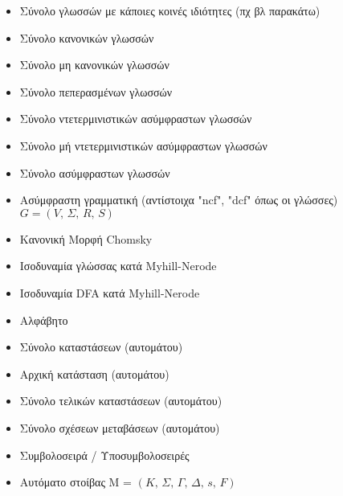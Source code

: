 

\doublespacing
\begin{itemize}
	\item{ Σύνολο γλωσσών με κάποιες κοινές ιδιότητες (πχ βλ παρακάτω)}
	\item{ Σύνολο κανονικών γλωσσών}
	\item{ Σύνολο μη κανονικών γλωσσών}
	\item{ Σύνολο πεπερασμένων γλωσσών}
	\item{ Σύνολο ντετερμινιστικών ασύμφραστων γλωσσών}
	\item{ Σύνολο μή ντετερμινιστικών ασύμφραστων γλωσσών}
	\item{ Σύνολο ασύμφραστων γλωσσών}
	\item{ Ασύμφραστη γραμματική (αντίστοιχα "ncf", "dcf" όπως οι γλώσσες)\\
		\makebox[2.15cm]{\hfill}$G=(V,\,\Sigma,\,R,\,S)$}
	\item{ Κανονική Μορφή Chomsky}
	\item{ Ισοδυναμία γλώσσας κατά Myhill-Nerode}
	\item{ Ισοδυναμία DFA κατά Myhill-Nerode}
	\item{\makebox[2cm]{$\Sigma$ \hfill} Αλφάβητο}
	\item{ Σύνολο καταστάσεων (αυτομάτου)}
	\item{ Αρχική κατάσταση (αυτομάτου)}
	\item{ Σύνολο τελικών καταστάσεων (αυτομάτου)}
	\item{ Σύνολο σχέσεων μεταβάσεων (αυτομάτου)}
	\item{ Συμβολοσειρά / Υποσυμβολοσειρές}
	\item{ Αυτόματο στοίβας Μ = $(K,\,\Sigma,\,\Gamma,\,\Delta,\,s,\,F)$}

\end{itemize}
